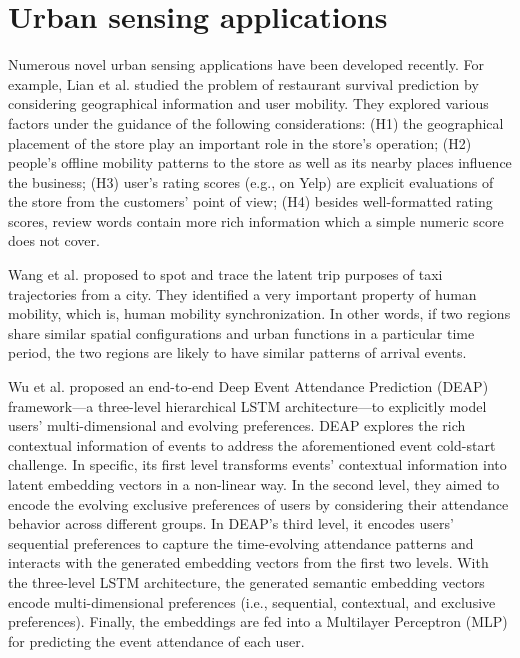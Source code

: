 
\section{Urban sensing applications}
Numerous novel urban sensing applications have been developed
recently. For example, Lian et al. \cite{p4} studied
the problem of restaurant survival prediction by considering geographical 
information and user mobility. They explored various factors under the guidance of the 
following considerations: (H1) the geographical placement of the
store play an important role in the store’s operation; (H2)
people’s offline mobility patterns to the store as well as its nearby places influence the business;
 (H3) user’s rating scores
(e.g., on Yelp) are explicit evaluations of the store from the
customers’ point of view; (H4) besides well-formatted rating
scores, review words contain more rich information which a
simple numeric score does not cover.

\noindent Wang et al. \cite{p5} proposed to spot and trace the latent trip purposes of taxi
trajectories from a city. They identified a very important
property of human mobility, which is, human mobility synchronization. In other words, 
if two regions share similar spatial configurations and urban functions in a particular 
time period, the two regions are likely to have similar patterns of arrival events.

\noindent Wu et al.\cite{p6} proposed an end-to-end Deep Event Attendance
Prediction (DEAP) framework—a three-level hierarchical LSTM architecture—to explicitly model 
users’ multi-dimensional and evolving preferences. DEAP explores the rich contextual 
information of events to address the aforementioned event cold-start challenge. In specific, its 
first level transforms events’ contextual information into latent embedding vectors in a non-linear way. 
In the second level, they aimed to encode the evolving exclusive preferences of users by considering their
 attendance behavior across different groups. In DEAP’s third level, it encodes users’ sequential 
 preferences to capture the time-evolving attendance patterns and interacts with the generated 
 embedding vectors from the first two levels.
With the three-level LSTM architecture, the generated semantic embedding vectors encode 
multi-dimensional preferences (i.e., sequential, contextual, and exclusive preferences). 
Finally, the embeddings are fed into a Multilayer Perceptron (MLP) for 
predicting the event attendance of each user. 

